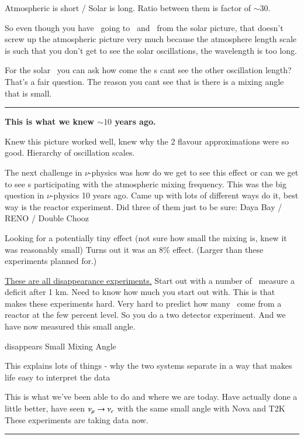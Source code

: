 {Atmospheric is short / Solar is long. 
Ratio between them is factor of $\sim$30.

So even though you have \nue\ going to \numu\ and \nutau\ from the solar picture, that doesn't screw up the atmospheric picture very much because the atmosphere length scale is such that you don't get to see the solar oscillations, the wavelength is too long. 

For the solar \nus\ you can ask how come the \nue s cant see the other oscillation length? 
That's a fair question. 
The reason you cant see that is there is a mixing angle that is small. 

\noindent\rule{\textwidth}{1pt}

\textbf{This is what we knew $\sim 10$ years ago.}

Knew this picture worked well, knew why the 2 flavour approximations were so good. 
Hierarchy of oscillation scales. 

The next challenge in $\nu$-physics was how do we get to see this effect or can we get to see \nue s participating with the atmospheric mixing frequency. 
This was the big question in $\nu$-physics 10 years ago.
Came up with lots of different ways do it, best way is the reactor experiment. 
Did three of them just to be sure:
\bc
Daya Bay / 
RENO  /
Double Chooz
\ec

Looking for a potentially tiny effect (not sure how small the mixing is, knew it was reasonably small) 
Turns out it was an 8\% effect. (Larger than these experiments planned for.)

\underline{These are all disappearance experiments.}
Start out with a number of \nus\ measure a deficit after 1 km. 
Need to know how much you start out with. 
This is that makes these experiments hard.
Very hard to predict how many \nus\ come from a reactor at the few percent level. 
So you do a two detector experiment. 
And we have now measured this small angle. 

\be
\nue \rightarrow \textrm{ disappears }
\ee
\bc
Small Mixing Angle
\ec

This explains lots of things
- why the two systems separate in a way that makes life easy to interpret the data

This is what we've been able to do and where we are today. 
Have actually done a little better, have seen $\nu_\mu \rightarrow \nu_e$ with the same small angle with Nova and T2K
These experiments are taking data now.


\noindent\rule{\textwidth}{1pt}

}
